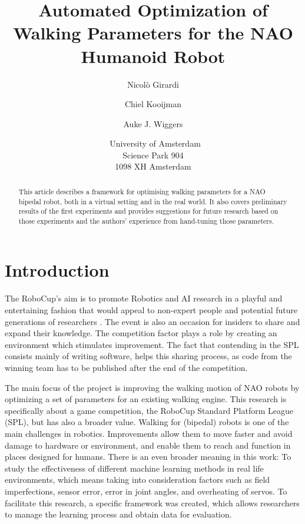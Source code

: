 \documentclass{article}
\title{\huge Automated Optimization of Walking Parameters for the NAO Humanoid Robot}
\author{Nicol\`o Girardi \affila \and
	Chiel Kooijman \affila \and
	Auke J. Wiggers \affila}
\date{\affila\ University of Amsterdam\\Science Park 904\\1098 XH Amsterdam}
\begin{document}
\ttl
\thispagestyle{empty}

\begin{abstract}
	\noindent
	This article describes a framework for optimising walking parameters for a
	NAO bipedal robot, both in a virtual setting and in the real world. It also
	covers preliminary results of the first experiments and provides
	suggestions for future research based on those experiments and the authors'
	experience from hand-tuning those parameters.
\end{abstract}

\section{Introduction}
The RoboCup's aim is to promote Robotics and AI research in a playful and
entertaining fashion that would appeal to non-expert people and potential
future generations of researchers \cite{kitano1997robocup}. The event is also
an occasion for insiders to share and expand their knowledge. The competition
factor plays a role by creating an environment which stimulates improvement.
The fact that contending in the SPL consists mainly of writing software, helps
this sharing process, as code from the winning team has to be published after
the end of the competition. 

The main focus of the project is improving the walking motion of NAO robots by
optimizing a set of parameters for an existing walking engine. This research is
specifically about a game competition, the RoboCup Standard Platform League
(SPL), but has also a broader value. Walking for (bipedal) robots is one of the
main challenges in robotics. Improvements allow them to move faster and avoid
damage to hardware or environment, and enable them to reach and function in
places designed for humans. There is an even broader meaning in this work: To
study the effectiveness of different machine learning methods in real life
environments, which means taking into consideration factors such as field
imperfections, sensor error, error in joint angles, and overheating of servos.
To facilitate this research, a specific framework was created, which allows
researchers to manage the learning process and obtain data for evaluation. 
\end{document}
